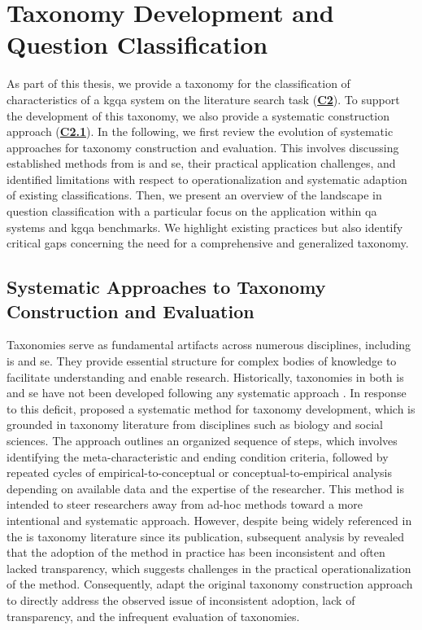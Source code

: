 
\section{Taxonomy Development and Question Classification}

As part of this thesis, we provide a taxonomy for the classification of characteristics of a \gls{kgqa} system on the literature search task (\hyperref[enum:c2]{\textbf{C2}}). To support the development of this taxonomy, we also provide a systematic construction approach (\hyperref[enum:c2]{\textbf{C2.1}}). In the following, we first review the evolution of systematic approaches for taxonomy construction and evaluation. This involves discussing established methods from \gls{is} and \gls{se}, their practical application challenges, and identified limitations with respect to operationalization and systematic adaption of existing classifications. Then, we present an overview of the landscape in question classification with a particular focus on the application within \gls{qa} systems and \gls{kgqa} benchmarks. We highlight existing practices but also identify critical gaps concerning the need for a comprehensive and generalized taxonomy.

\subsection{Systematic Approaches to Taxonomy Construction and Evaluation}
\label{sec:related_work_taxonomy_construction}

Taxonomies serve as fundamental artifacts across numerous disciplines, including \gls{is} and \gls{se}. They provide essential structure for complex bodies of knowledge to facilitate understanding and enable research. Historically, taxonomies in both \gls{is} and \gls{se} have not been developed following any systematic approach \cite{usman_taxonomies_2017,nickerson_method_2013}. In response to this deficit, \textcite{nickerson_method_2013} proposed a systematic method for taxonomy development, which is grounded in taxonomy literature from disciplines such as biology and social sciences. The approach outlines an organized sequence of steps, which involves identifying the meta-characteristic and ending condition criteria, followed by repeated cycles of empirical-to-conceptual or conceptual-to-empirical analysis depending on available data and the expertise of the researcher. This method is intended to steer researchers away from ad-hoc methods toward a more intentional and systematic approach. However, despite being widely referenced in the \gls{is} taxonomy literature since its publication, subsequent analysis by \textcite{kundisch_update_2022} revealed that the adoption of the \textcite{nickerson_method_2013} method in practice has been inconsistent and often lacked transparency, which suggests challenges in the practical operationalization of the method. Consequently, \textcite{kundisch_update_2022} adapt the original taxonomy construction approach to directly address the observed issue of inconsistent adoption, lack of transparency, and the infrequent evaluation of taxonomies.

